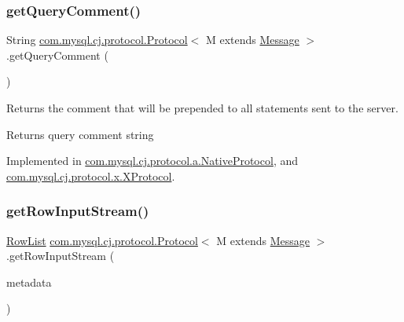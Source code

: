 \mbox{\label{interfacecom_1_1mysql_1_1cj_1_1protocol_1_1_protocol_a8a25c27a012f47ca25de357e65829884}} 
\subsubsection{\texorpdfstring{get\+Query\+Comment()}{getQueryComment()}}
{\footnotesize\ttfamily String \mbox{\hyperlink{interfacecom_1_1mysql_1_1cj_1_1protocol_1_1_protocol}{com.\+mysql.\+cj.\+protocol.\+Protocol}}$<$ M extends \mbox{\hyperlink{interfacecom_1_1mysql_1_1cj_1_1protocol_1_1_message}{Message}} $>$.get\+Query\+Comment (\begin{DoxyParamCaption}{ }\end{DoxyParamCaption})}

Returns the comment that will be prepended to all statements sent to the server.

\begin{DoxyReturn}{Returns}
query comment string 
\end{DoxyReturn}


Implemented in \mbox{\hyperlink{classcom_1_1mysql_1_1cj_1_1protocol_1_1a_1_1_native_protocol_a49cbec750255abc9a23f447effd70d1d}{com.\+mysql.\+cj.\+protocol.\+a.\+Native\+Protocol}}, and \mbox{\hyperlink{classcom_1_1mysql_1_1cj_1_1protocol_1_1x_1_1_x_protocol_aa6abdec32fdb1e18c44c33b831b40e20}{com.\+mysql.\+cj.\+protocol.\+x.\+X\+Protocol}}.

\mbox{\label{interfacecom_1_1mysql_1_1cj_1_1protocol_1_1_protocol_a9e859d7ef531819c5bdef288f650ab83}} 
\subsubsection{\texorpdfstring{get\+Row\+Input\+Stream()}{getRowInputStream()}}
{\footnotesize\ttfamily \mbox{\hyperlink{interfacecom_1_1mysql_1_1cj_1_1result_1_1_row_list}{Row\+List}} \mbox{\hyperlink{interfacecom_1_1mysql_1_1cj_1_1protocol_1_1_protocol}{com.\+mysql.\+cj.\+protocol.\+Protocol}}$<$ M extends \mbox{\hyperlink{interfacecom_1_1mysql_1_1cj_1_1protocol_1_1_message}{Message}} $>$.get\+Row\+Input\+Stream (\begin{DoxyParamCaption}\item[{\mbox{\hyperlink{interfacecom_1_1mysql_1_1cj_1_1protocol_1_1_column_definition}{Column\+Definition}}}]{metadata }\end{DoxyParamCaption})}



